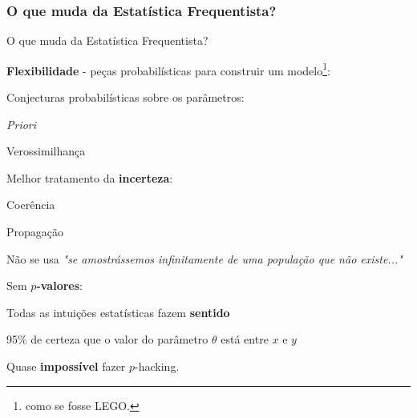 \subsubsection{O que muda da Estatística Frequentista?}
\begin{frame}{O que muda da Estatística Frequentista?}
    \begin{vfilleditems}
        \item \textbf{Flexibilidade} - peças probabilísticas para construir um modelo\footnote{como se fosse LEGO.}:
            \begin{vfilleditems}
                \item Conjecturas probabilísticas sobre os parâmetros:
                \begin{vfilleditems}
                    \item \textit{Priori}
                    \item Verossimilhança
                \end{vfilleditems}
            \end{vfilleditems}
        \item Melhor tratamento da \textbf{incerteza}:
        \begin{vfilleditems}
            \item Coerência
            \item Propagação
            \item Não se usa \textit{"se amostrássemos infinitamente de uma população que não existe..."}
        \end{vfilleditems}
        \item Sem \textbf{$p$-valores}:
        \begin{vfilleditems}
            \item Todas as intuições estatísticas fazem \textbf{sentido}
            \item 95\% de certeza que o valor do parâmetro $\theta$ está entre $x$ e $y$
            \item Quase \textbf{impossível} fazer $p$-hacking.
        \end{vfilleditems}
\end{vfilleditems}
\end{frame}

